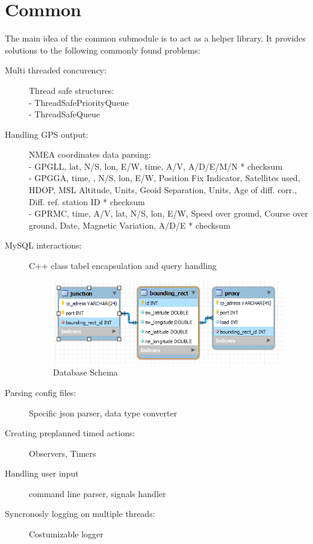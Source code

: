 \documentclass[17pt]{report}
\begin{document}
\section{Common}
\indent \indent
The main idea of the common submodule is to act as a helper library. It provides 
solutions to the following commonly found problems:
\begin{description}
    \item[Multi threaded concurency:] Thread safe structures:\\
    - ThreadSafePriorityQueue\\
    - ThreadSafeQueue
    \item[Handling GPS output:] NMEA coordinates data parsing: \\
    - GPGLL, lat, N/S, lon, E/W, time, A/V, A/D/E/M/N * checksum\\
    - GPGGA, time, , N/S, lon, E/W, Position Fix Indicator, Satellites used, HDOP, MSL Altitude, Units, 
	Geoid Separation, Units, Age of diff. corr., Diff. ref. station ID * checksum\\
    - GPRMC, time, A/V, lat, N/S, lon, E/W, Speed over ground,
    Course over ground, Date, Magnetic Variation, A/D/E * checksum
    \item[MySQL interactions:] C++ class tabel encapsulation and query handling
    \begin{figure}[h!]
        \includegraphics[width=\textwidth]{DB/DbSchema.png}
        \caption{Database Schema}
        \label{fig:Database Schema}
    \end{figure}
    \item[Parsing config files:] Specific json parser, data type converter
    \item[Creating preplanned timed actions:] Observers, Timers 
    \item[Handling user input] command line parser, signals handler
    \item[Syncronosly logging on multiple threads:] Costumizable logger
\end{description}
\end{document}
